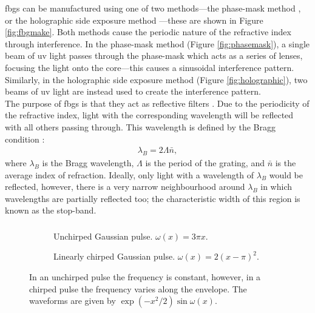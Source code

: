 \gls{fbg}s can be manufactured using one of two methods---the phase-mask method \cite{agrawal2002, alazzawi, becker, starodoumov}, or the holographic side exposure method \cite{agrawal2002, alazzawi, becker, ferreira, starodoumov}---these are shown in Figure \ref{fig:fbgmake}. Both methods cause the periodic nature of the refractive index through interference. In the phase-mask method (Figure \ref{fig:phasemask}), a single beam of \gls{uv} light passes through the phase-mask which acts as a series of lenses, focusing the light onto the core---this causes a sinusoidal interference pattern. Similarly, in the holographic side exposure method (Figure \ref{fig:holographic}), two beams of \gls{uv} light are instead used to create the interference pattern. \\

The purpose of \gls{fbg}s is that they act as reflective filters \cite{agrawal2002, alazzawi, ferreira, starodoumov}. Due to the periodicity of the refractive index, light with the corresponding wavelength will be reflected with all others passing through. This wavelength is defined by the Bragg condition \cite{agrawal2002, alazzawi, becker, ferreira, silfvast, starodoumov}:
\begin{align}
\label{eq:bragg}
\lambda_B = 2 \Lambda \bar{n},
\end{align}
where $\lambda_B$ is the Bragg wavelength, $\Lambda$ is the period of the grating, and $\bar{n}$ is the average index of refraction. Ideally, only light with a wavelength of $\lambda_B$ would be reflected, however, there is a very narrow neighbourhood around $\lambda_B$ in which wavelengths are partially reflected too; the characteristic width of this region is known as the stop-band. \\

\subsubsection{}
\begin{figure}[tbp]
\begin{subfigure}{0.5\textwidth}

\caption{Unchirped Gaussian pulse. $\omega(x) = 3 \pi x$.}
\label{fig:unchirped}
\end{subfigure}
\begin{subfigure}{0.5\textwidth}

\caption{Linearly chirped Gaussian pulse. $\omega(x) = 2 (x - \pi)^2$.}
\label{fig:chirped}
\end{subfigure}
\caption[Comparison of a chirped and unchirped Gaussian pulse.]{In an unchirped pulse the frequency is constant, however, in a chirped pulse the frequency varies along the envelope. The waveforms are given by $\exp \left( -x^2/2 \right) \sin \omega (x)$.}
\label{fig:chirp}
\end{figure}

